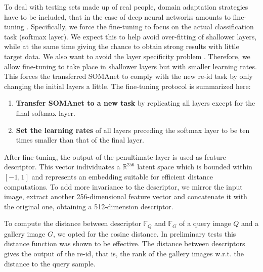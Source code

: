 \documentclass[10pt,journal,letterpaper,compsoc]{IEEEtran}
\begin{document}
To deal with testing sets made up of real people, domain adaptation strategies have to be included, that in the case of deep neural networks amounts to fine-tuning \cite{DonahueJVHZTD14}.
Specifically, we force the fine-tuning to focus on the actual classification task (softmax layer). We expect this to help avoid over-fitting of shallower layers, while at the same time giving the chance to obtain strong results with little target data.
We also want to avoid the layer specificity problem \cite{yosinkiFT}. Therefore, we allow fine-tuning to take place in shallower layers but with smaller learning rates. This forces the transferred SOMAnet to comply with the new re-id task by only changing the initial layers a little.
The fine-tuning protocol is summarized here:
\begin{enumerate}
    \item \textbf{Transfer SOMAnet to a new task} by replicating all layers except for the final softmax layer.
    \item \textbf{Set the learning rates} of all layers  preceding  the softmax layer to be ten times smaller than that of the final layer.
\end{enumerate}

After fine-tuning, the output of the penultimate layer
is used as feature descriptor. This vector individuates a $\mathbb{R}^{256}$ latent space which is bounded within $[-1, 1]$ and represents an embedding suitable for efficient distance computations. To add more invariance to the descriptor, we mirror the input image, extract another 256-dimensional feature vector and concatenate it with the original one, obtaining a 512-dimension descriptor.


To compute the distance between descriptor $\mathbb{F}_Q$  and $\mathbb{F}_G$ of a query image $Q$ and a gallery image $G$,
we opted for the cosine distance. In preliminary tests this distance function was shown to be effective. The distance between descriptors gives the output of the re-id, that is, the rank of the gallery images w.r.t. the distance to the query sample.
\end{document}
